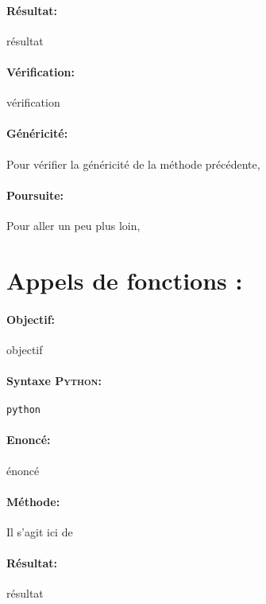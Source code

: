 \documentclass[11pt,a4paper,colorlinks,breaklinks]{article}
\def\python{\textsc{Python}}
\begin{document}
\paragraph{Résultat:} résultat

\paragraph{Vérification:} vérification

\paragraph{Généricité:} Pour vérifier la généricité de la méthode précédente,

\paragraph{Poursuite:} Pour aller un peu plus loin,


\newpage
\section{Appels de fonctions : }\label{maths:appels}
\paragraph{Objectif:} objectif

\paragraph{Syntaxe \python:} \texttt{python}

\begin{framed}
\paragraph{Enoncé:} énoncé
\end{framed}

\paragraph{Méthode:} Il s'agit ici de 

\paragraph{Résultat:} résultat
\end{document}
